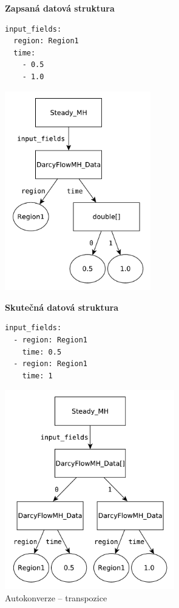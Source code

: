 \documentclass[FM,bw,DP]{tulthesis}
\begin{document}
\begin{figure}[ht]
\begin{minipage}[t]{0.45\linewidth}
\vspace{0pt}
\textbf{Zapsaná datová struktura}\\
\vspace{-5pt}
\begin{lstlisting}
input_fields:
  region: Region1
  time:
    - 0.5
    - 1.0
\end{lstlisting}
\vspace{-20pt}
\begin{center}
\includegraphics[height=245pt]{../img/autoconversion_transposition_before.pdf}
\end{center}
\end{minipage}
\quad
\begin{minipage}[t]{0.5\linewidth}
\vspace{0pt}
\textbf{Skutečná datová struktura}\\
\vspace{-5pt}
\begin{lstlisting}
input_fields:
  - region: Region1
    time: 0.5
  - region: Region1
    time: 1
\end{lstlisting}
\vspace{-20pt}
\begin{center}
\includegraphics[height=245pt]{../img/autoconversion_transposition_after.pdf}
\end{center}
\end{minipage}
\caption{Autokonverze -- transpozice}
\label{img:autoconversion_transposition}
\end{figure}	
\end{document}

